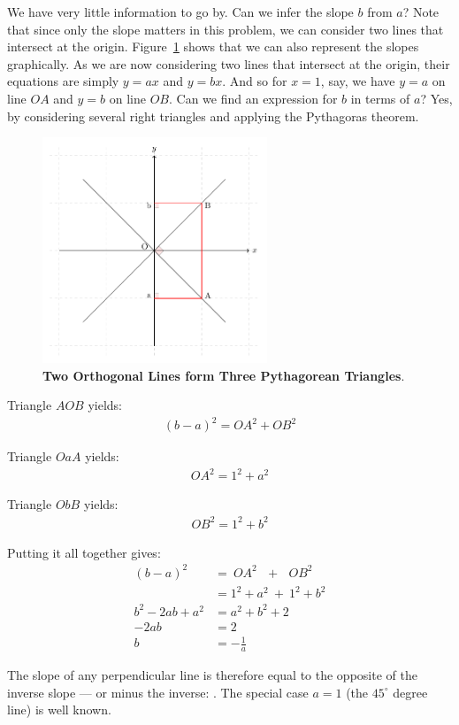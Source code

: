 \documentclass[12pt]{article}
\begin{document}
We have very little information to go by. Can we infer the slope $b$ from $a$? Note that since only the slope matters in this problem, we can consider two lines that intersect at the origin. Figure~\ref{fig:slopes:02} shows that we can also represent the slopes graphically. As we are now considering two lines that intersect at the origin, their equations are simply $y=ax$ and $y=bx$. And so for $x=1$, say, we have $y=a$ on line $OA$ and $y=b$ on line $OB$. Can we find an expression for $b$ in terms of $a$? Yes, by considering several right triangles and applying the Pythagoras theorem.
\begin{figure}[hpbt]
\begin{minipage}[b]{\textwidth}
\centering
\includegraphics[width=0.6\textwidth]
{coordinates-and-slopes-2}
\caption{\textbf{Two Orthogonal Lines form Three Pythagorean Triangles}. 
\label{fig:slopes:02}}
\end{minipage}
\end{figure}

Triangle $AOB$ yields:
\begin{align*}
(b-a)^2 = OA^2 + OB^2
\end{align*}

Triangle $OaA$ yields:
\begin{align*}
OA^2 = 1^2 + a^2
\end{align*}

Triangle $ObB$ yields:
\begin{align*}
OB^2 = 1^2 + b^2
\end{align*}

Putting it all together gives:
\begin{align*}
(b-a)^2 
  & = ~OA^2~~~ + ~~~OB^2 \\
  & = 1^2 + a^2 ~+~ 1^2 + b^2 \\
b^2 - 2ab + a^2 
  & = a^2 + b^2 + 2 \\
-2ab & = 2\\
b & = -\frac{1}{a}
\end{align*}

The slope of any perpendicular line is therefore equal to the opposite of the inverse slope --- or minus the inverse: . The special case $a=1$ (the $45^\circ$ degree line) is well known. 
\end{document}
